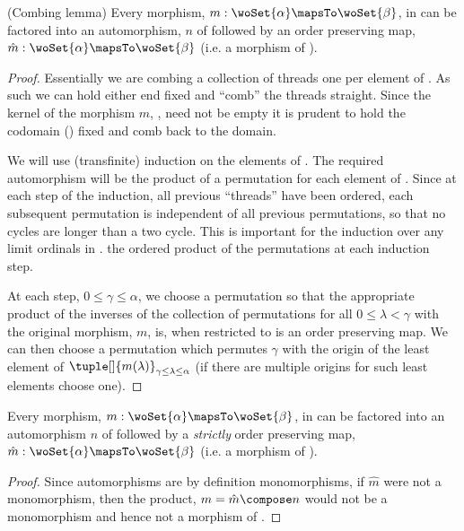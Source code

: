 \begin{lemma} (Combing lemma)
Every morphism, $m : \woSet{\alpha} \mapsTo \woSet{\beta}$, in \sDeltaC{}{} can be
factored into an automorphism, $n$ of \woSet{\alpha} followed by an order preserving map,
$\hat{m} : \woSet{\alpha} \mapsTo \woSet{\beta}$ (i.e. a morphism of \DeltaC{}{}).
\end{lemma}
\begin{proof} 
Essentially we are combing a collection of threads one per element of \woSet{\alpha}.  As
such we can hold either end fixed and ``comb'' the threads straight. Since the kernel of
the morphism $m$, , need not be empty it is prudent to hold the codomain
(\woSet{\beta}) fixed and comb back to the domain.

We will use (transfinite) induction on the elements of \woSet{\alpha}. The required
automorphism will be the product of a permutation for each element of \woSet{\alpha}. 
Since at each step of the induction, all previous ``threads'' have been ordered, each
subsequent permutation is independent of all previous permutations, so that no cycles are
longer than a two cycle.  This is important for the induction over any limit ordinals in
\woSet{\alpha}. the ordered product of the permutations at each induction step.

At each step, $0 \leq \gamma \leq \alpha$, we choose a permutation so that the appropriate
product of the inverses of the collection of permutations for all $0 \leq \lambda <
\gamma$ with the original morphism, $m$, is, when restricted to \set{\lambda \suchThat
\lambda < \gamma} is an order preserving map. We can then choose a permutation which
permutes $\gamma$ with the origin of the least element of $\tuple[]{m(\lambda)}_{\gamma
\leq \lambda \leq \alpha}$ (if there are multiple origins for such least elements choose
one).
\end{proof}

\begin{corollary}
Every morphism, $m : \woSet{\alpha} \mapsTo \woSet{\beta}$, in \sNdDeltaC{}{} can be
factored into an automorphism $n$ of \woSet{\alpha} followed by a \emph{strictly} order
preserving map, $\hat{m} : \woSet{\alpha} \mapsTo \woSet{\beta}$ (i.e. a morphism of
\ndDeltaC{}{}).
\end{corollary}
\begin{proof}
Since automorphisms are by definition monomorphisms, if $\hat{m}$ were not a monomorphism,
then the product, $m = \hat{m} \compose n$ would not be a monomorphism and hence not a
morphism of \sNdDeltaC{}{}.
\end{proof}

